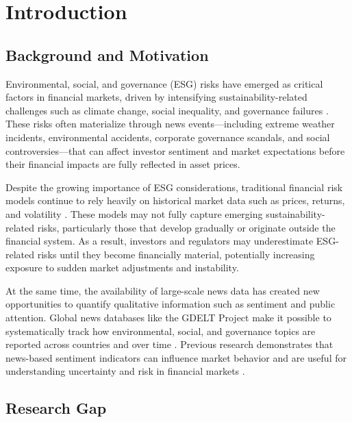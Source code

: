 \documentclass[12pt,a4paper]{article}
\begin{document}
\onehalfspacing

\section{Introduction}
\label{sec:introduction}

\subsection{Background and Motivation}
\label{subsec:background}

Environmental, social, and governance (ESG) risks have emerged as critical factors in financial markets, driven by intensifying sustainability-related challenges such as climate change, social inequality, and governance failures \citep{friede2015esg}. These risks often materialize through news events—including extreme weather incidents, environmental accidents, corporate governance scandals, and social controversies—that can affect investor sentiment and market expectations before their financial impacts are fully reflected in asset prices.

Despite the growing importance of ESG considerations, traditional financial risk models continue to rely heavily on historical market data such as prices, returns, and volatility \citep{baker2016measuring}. These models may not fully capture emerging sustainability-related risks, particularly those that develop gradually or originate outside the financial system. As a result, investors and regulators may underestimate ESG-related risks until they become financially material, potentially increasing exposure to sudden market adjustments and instability.

At the same time, the availability of large-scale news data has created new opportunities to quantify qualitative information such as sentiment and public attention. Global news databases like the GDELT Project make it possible to systematically track how environmental, social, and governance topics are reported across countries and over time \citep{leetaru2013gdelt}. Previous research demonstrates that news-based sentiment indicators can influence market behavior and are useful for understanding uncertainty and risk in financial markets \citep{tetlock2007giving}.

\subsection{Research Gap}
\label{subsec:gap}
\end{document}
